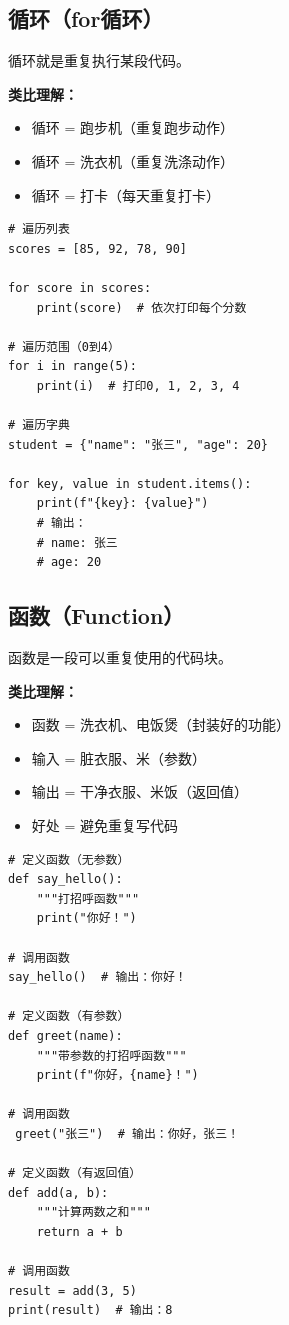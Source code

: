 \documentclass[12pt,a4paper]{article}
\begin{document}
\subsection{循环（for循环）}

\begin{knowledgebox}[什么是循环？]
循环就是重复执行某段代码。

\textbf{类比理解：}
\begin{itemize}
    \item 循环 = 跑步机（重复跑步动作）
    \item 循环 = 洗衣机（重复洗涤动作）
    \item 循环 = 打卡（每天重复打卡）
\end{itemize}
\end{knowledgebox}

\begin{lstlisting}[caption={循环示例}]
# 遍历列表
scores = [85, 92, 78, 90]

for score in scores:
    print(score)  # 依次打印每个分数

# 遍历范围（0到4）
for i in range(5):
    print(i)  # 打印0, 1, 2, 3, 4

# 遍历字典
student = {"name": "张三", "age": 20}

for key, value in student.items():
    print(f"{key}: {value}")
    # 输出：
    # name: 张三
    # age: 20
\end{lstlisting}

\subsection{函数（Function）}

\begin{knowledgebox}[什么是函数？]
函数是一段可以重复使用的代码块。

\textbf{类比理解：}
\begin{itemize}
    \item 函数 = 洗衣机、电饭煲（封装好的功能）
    \item 输入 = 脏衣服、米（参数）
    \item 输出 = 干净衣服、米饭（返回值）
    \item 好处 = 避免重复写代码
\end{itemize}
\end{knowledgebox}

\begin{lstlisting}[caption={函数示例}]
# 定义函数（无参数）
def say_hello():
    """打招呼函数"""
    print("你好！")

# 调用函数
say_hello()  # 输出：你好！

# 定义函数（有参数）
def greet(name):
    """带参数的打招呼函数"""
    print(f"你好，{name}！")

# 调用函数
 greet("张三")  # 输出：你好，张三！

# 定义函数（有返回值）
def add(a, b):
    """计算两数之和"""
    return a + b

# 调用函数
result = add(3, 5)
print(result)  # 输出：8
\end{lstlisting}
\end{document}

